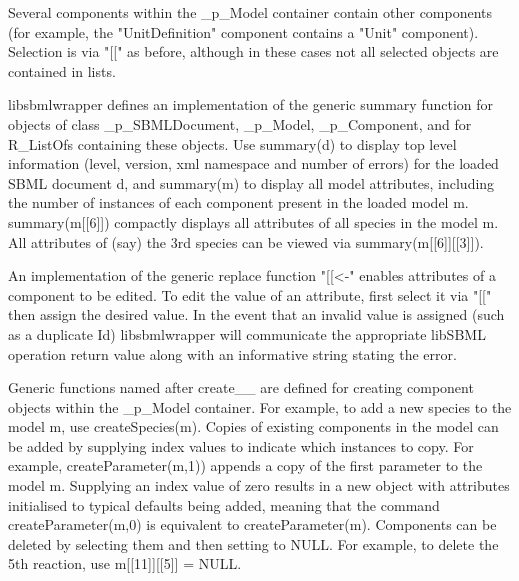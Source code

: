 \documentclass{bioinfo}
\begin{document}
\begin{methods}
\par Several components within the \_p\_Model container contain other components (for example, the "UnitDefinition" component contains a "Unit" component). Selection is via "{\selectfont [[}" as before, although in these cases not all selected objects are contained in lists.

\par libsbmlwrapper defines an implementation of the generic summary function for objects of class \_p\_SBMLDocument, \_p\_Model, \_p\_Component, and for R\_ListOfs containing these objects. Use {\selectfont summary(d)} to display top level information (level, version, xml namespace and number of errors) for the loaded SBML document d, and {\selectfont summary(m)} to display all model attributes, including the number of instances of each component present in the loaded model m. {\selectfont summary(m[[6]])} compactly displays all attributes of all species in the model m. All attributes of (say) the 3rd species can be viewed via {\selectfont summary(m[[6]][[3]])}.

\par An implementation of the generic replace function "{\selectfont [[<-}" enables attributes of a component to be edited. To edit the value of an attribute, first select it via "{\selectfont [[}" then assign the desired value. In the event that an invalid value is assigned (such as a duplicate Id) libsbmlwrapper will communicate the appropriate libSBML operation return value along with an informative string stating the error.

\par Generic functions named after create\_\_ are defined for creating component objects within the \_p\_Model container. For example, to add a new species to the model m, use {\selectfont createSpecies(m)}. Copies of existing components in the model can be added by supplying index values to indicate which instances to copy. For example, {\selectfont createParameter(m,1))} appends a copy of the first parameter to the model {\selectfont m}. Supplying an index value of zero results in a new object with attributes initialised to typical defaults being added, meaning that the command {\selectfont createParameter(m,0)} is equivalent to {\selectfont createParameter(m)}. Components can be deleted by selecting them and then setting to NULL. For example, to delete the 5th reaction, use {\selectfont m[[11]][[5]] = NULL}.\\

\end{methods}
\end{document}
